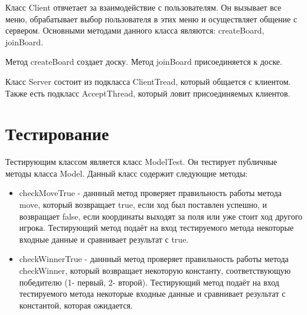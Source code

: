 \documentclass[a4paper,14pt]{extarticle} %
\begin{document}
Класс Client отвчетает за взаимодействие с пользователям. Он вызывает все меню, обрабатывает выбор пользователя в этих меню и осуществляет общение с сервером. Основными методами данного класса являются: createBoard, joinBoard.
 
Метод createBoard создает доску. Метод joinBoard присоединяется к доске.

Класс Server состоит из подкласса ClientTread, который общается с клиентом. Также есть подкласс AcceptThread, который ловит присоединяемых клиентов.

\newpage
\section*{Тестирование}
Тестирующим классом является класс ModelTest. Он тестирует публичные методы класса Model. Данный класс содержит следующие методы: 
\begin{itemize}
	\item{checkMoveTrue - даннный метод проверяет правильность работы метода move, который возвращает true, если ход был поставлен успешно, и возвращает false, если координаты выходят за поля или уже стоит ход другого игрока. Тестирующий метод подаёт на вход тестируемого метода некоторые входные данные и сравнивает результат с true.}
	\item{checkWinnerTrue - даннный метод проверяет правильность работы метода checkWinner, который возвращает некоторую константу, соответствующую победителю (1- первый, 2- второй). Тестирующий метод подаёт на вход тестируемого метода некоторые входные данные и сравнивает результат с константой, которая ожидается.}
\end{itemize}
\end{document}
